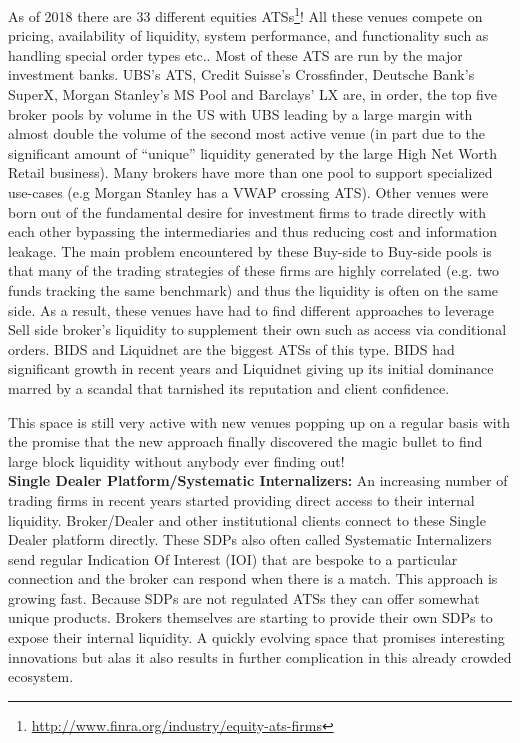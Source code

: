 As of 2018 there are 33 different equities ATSs\footnote{\url{http://www.finra.org/industry/equity-ats-firms}}!  All these venues compete on pricing, availability of liquidity, system performance, and functionality such as handling special order types etc.. Most of these ATS are run by the major investment banks. UBS's ATS, Credit Suisse's Crossfinder, Deutsche Bank's SuperX, Morgan Stanley's MS Pool and Barclays' LX are, in order,  the top five broker pools by volume in the US with UBS leading by a large margin with almost double the volume of the second most active venue (in part due to the significant amount of ``unique'' liquidity generated by the large High Net Worth Retail business).  Many brokers have more than one pool to support specialized use-cases (e.g Morgan Stanley has a VWAP crossing ATS). Other venues were born out of the fundamental desire for investment firms to trade directly with each other bypassing the intermediaries and  thus reducing cost and information leakage.  The main problem encountered by these Buy-side to Buy-side pools is that many of the trading strategies of these firms are highly correlated (e.g. two funds tracking the same benchmark) and thus the liquidity is often  on the same side. As a result, these venues have had to find different approaches to leverage Sell side broker's liquidity to supplement their own such as access via conditional orders. BIDS and Liquidnet  are the biggest ATSs of this type. BIDS had significant growth in recent years and Liquidnet giving up its initial dominance marred by a scandal that tarnished its reputation and client confidence.


This space is still very active with new venues popping up on a regular basis with the promise that the new approach finally discovered the magic bullet to find large block liquidity without anybody ever finding out! \\


\noindent\textbf{Single Dealer Platform/Systematic Internalizers:} An increasing number of trading firms in recent years started providing direct access to their internal liquidity. Broker/Dealer and other institutional clients connect to these Single Dealer platform directly. These SDPs also often called Systematic Internalizers send regular Indication Of Interest (IOI)  that are bespoke to a particular connection and the broker can respond when there is a match. This approach is growing fast. Because SDPs are not regulated ATSs they can offer somewhat unique products. Brokers themselves are starting to provide their own SDPs to expose their internal liquidity. A quickly evolving space that promises interesting innovations but alas it also results in further complication in this already crowded ecosystem. \\


